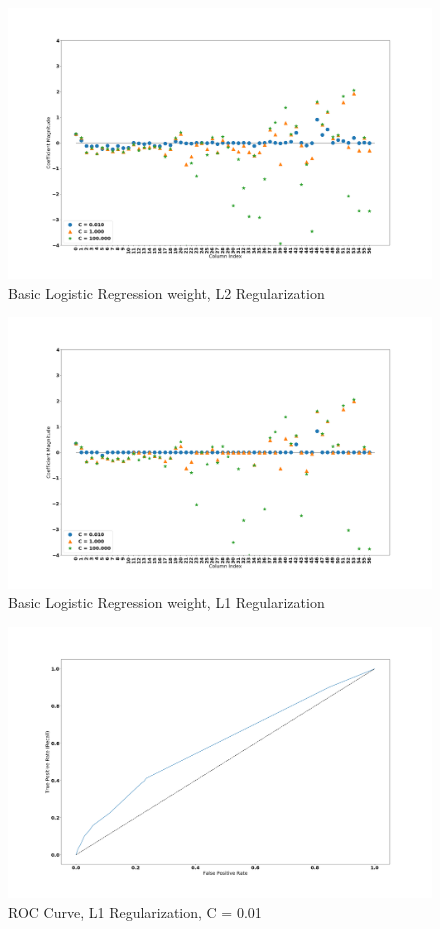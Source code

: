 \documentclass[sigconf]{acmart}
\begin{document}
\begin{figure}[!ht]
  \centering\includegraphics[width=\columnwidth]{images/weights_l2.png}
  \caption{Basic Logistic Regression weight, L2 Regularization}\label{f:weights_l2}
\end{figure}

\begin{figure}[!ht]
  \centering\includegraphics[width=\columnwidth]{images/weights_l1.png}
  \caption{Basic Logistic Regression weight, L1 Regularization}\label{f:weights_l1}
\end{figure}

\begin{figure}[!ht]
  \centering\includegraphics[width=\columnwidth]{images/roc_curve_001.png}
  \caption{ROC Curve, L1 Regularization, C = 0.01}\label{f:roc_curve_001}
\end{figure}
\end{document}
